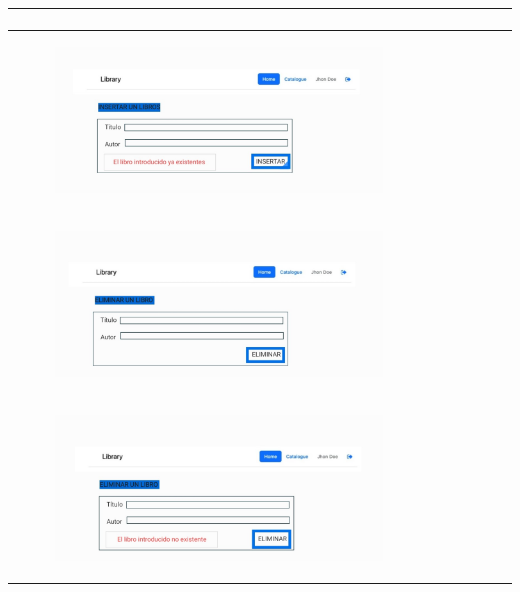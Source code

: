 \documentclass{report}
\begin{document}
\begin{longtable}{|p{\linewidth}|}
\begin{figure}[H]
                    \end{figure}\\
                    \hline
                    \begin{figure}[H]
                        \centering
                        \includegraphics[width=0.8\textwidth]{./img/grafico/ErrorInsertarLibro.jpg}
                    \end{figure}\\
                    \hline
                    \begin{figure}[H]
                        \centering
                        \includegraphics[width=0.8\textwidth]{./img/grafico/EliminarLibro.jpg}
                    \end{figure}\\
                    \hline
                    \begin{figure}[H]
                        \centering
                        \includegraphics[width=0.8\textwidth]{./img/grafico/ErrorEliminarLibro.jpg}
                    \end{figure}\\

\end{longtable}
\end{document}
